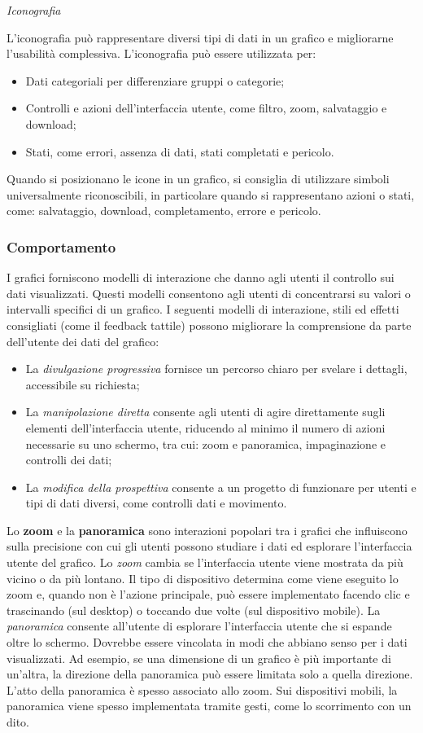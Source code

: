 \documentclass[12pt, a4paper]{report}
\begin{document}
	\textit{Iconografia}

	L'iconografia può rappresentare diversi tipi di dati in un grafico e migliorarne l'usabilità complessiva. L'iconografia può essere utilizzata per:
	\begin{itemize}
		\item Dati categoriali per differenziare gruppi o categorie;
		\item Controlli e azioni dell'interfaccia utente, come filtro, zoom, salvataggio e download;
		\item Stati, come errori, assenza di dati, stati completati e pericolo.
	\end{itemize}
	Quando si posizionano le icone in un grafico, si consiglia di utilizzare simboli universalmente riconoscibili, in particolare quando si rappresentano azioni o stati, come: salvataggio, download, completamento, errore e pericolo.

	\subsubsection{Comportamento}
	I grafici forniscono modelli di interazione che danno agli utenti il controllo sui dati visualizzati. Questi modelli consentono agli utenti di concentrarsi su valori o intervalli specifici di un grafico. I seguenti modelli di interazione, stili ed effetti consigliati (come il feedback tattile) possono migliorare la comprensione da parte dell'utente dei dati del grafico:
	\begin{itemize}
		\item La \textit{divulgazione progressiva} fornisce un percorso chiaro per svelare i dettagli, accessibile su richiesta;
		\item La \textit{manipolazione diretta} consente agli utenti di agire direttamente sugli elementi dell'interfaccia utente, riducendo al minimo il numero di azioni necessarie su uno schermo, tra cui: zoom e panoramica, impaginazione e controlli dei dati;
		\item La \textit{modifica della prospettiva} consente a un progetto di funzionare per utenti e tipi di dati diversi, come controlli dati e movimento.
	\end{itemize}

	Lo \textbf{zoom} e la \textbf{panoramica} sono interazioni popolari tra i grafici che influiscono sulla precisione con cui gli utenti possono studiare i dati ed esplorare l'interfaccia utente del grafico.
	Lo \textit{zoom} cambia se l'interfaccia utente viene mostrata da più vicino o da più lontano. Il tipo di dispositivo determina come viene eseguito lo zoom e, quando non è l'azione principale, può essere implementato facendo clic e trascinando (sul desktop) o toccando due volte (sul dispositivo mobile).
	La \textit{panoramica} consente all'utente di esplorare l'interfaccia utente che si espande oltre lo schermo. Dovrebbe essere vincolata in modi che abbiano senso per i dati visualizzati. Ad esempio, se una dimensione di un grafico è più importante di un'altra, la direzione della panoramica può essere
	limitata solo a quella direzione. L'atto della panoramica è spesso associato allo zoom. Sui dispositivi mobili, la panoramica viene spesso implementata tramite gesti, come lo scorrimento con un dito.
\end{document}
